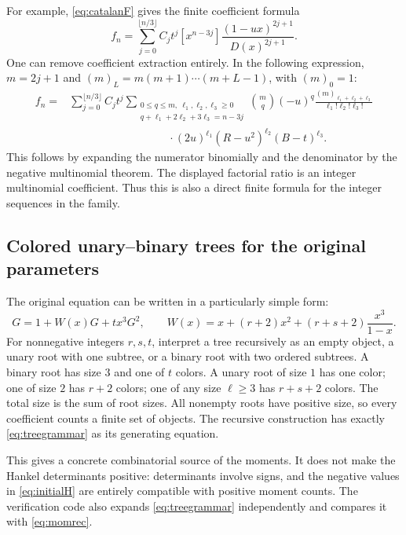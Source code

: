 \documentclass[11pt,a4paper]{article}
\numberwithin{equation}{section}
\theoremstyle{definition}
\begin{document}
For example, \eqref{eq:catalanF} gives the finite coefficient formula
\begin{equation}\label{eq:finitecoef}
 f_n=\sum_{j=0}^{\lfloor n/3\rfloor}C_jt^j
       [x^{n-3j}]\frac{(1-ux)^{2j+1}}{D(x)^{2j+1}}.
\end{equation}
One can remove coefficient extraction entirely. In the following expression,
$m=2j+1$ and $(m)_L=m(m+1)\cdots(m+L-1)$, with $(m)_0=1$:
\begin{equation}\label{eq:multinomial}
 \begin{split}
 f_n={}&\sum_{j=0}^{\lfloor n/3\rfloor}C_jt^j
 \sum_{\substack{0\leq q\leq m,\ \ell_1,\ell_2,\ell_3\geq0\\
 q+\ell_1+2\ell_2+3\ell_3=n-3j}}
 \binom{m}{q}(-u)^q
 \frac{(m)_{\ell_1+\ell_2+\ell_3}}{\ell_1!\ell_2!\ell_3!}\\
 &\hspace{9em}\cdot(2u)^{\ell_1}(R-u^2)^{\ell_2}(B-t)^{\ell_3}.
 \end{split}
\end{equation}
This follows by expanding the numerator binomially and the denominator by
the negative multinomial theorem. The displayed factorial ratio is an
integer multinomial coefficient. Thus this is also a direct finite formula
for the integer sequences in the family.

\subsection{Colored unary--binary trees for the original parameters}
The original equation can be written in a particularly simple form:
\begin{equation}\label{eq:treegrammar}
 G=1+W(x)G+tx^3G^2,\qquad
 W(x)=x+(r+2)x^2+(r+s+2)\frac{x^3}{1-x}.
\end{equation}
For nonnegative integers $r,s,t$, interpret a tree recursively as an empty
object, a unary root with one subtree, or a binary root with two ordered
subtrees. A binary root has size $3$ and one of $t$ colors. A unary root of
size $1$ has one color; one of size $2$ has $r+2$ colors; one of any size
$\ell\geq3$ has $r+s+2$ colors. The total size is the sum of root sizes.
All nonempty roots have positive size, so every coefficient counts a finite
set of objects. The recursive construction has exactly
\eqref{eq:treegrammar} as its generating equation.

This gives a concrete combinatorial source of the moments. It does not make
the Hankel determinants positive: determinants involve signs, and the
negative values in \eqref{eq:initialH} are entirely compatible with positive
moment counts. The verification code also expands \eqref{eq:treegrammar}
independently and compares it with \eqref{eq:momrec}.
\end{document}
